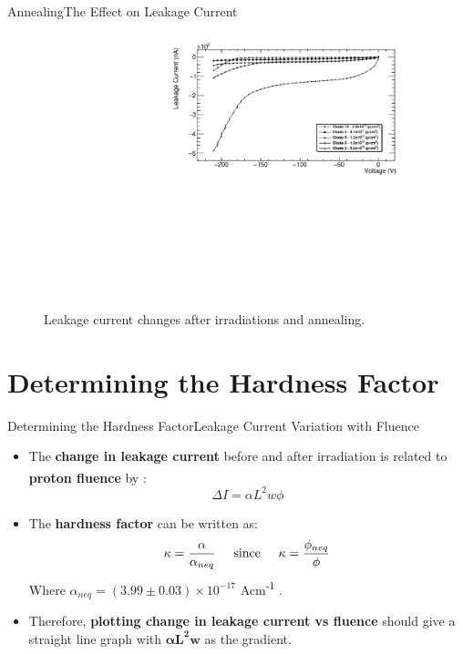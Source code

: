 \documentclass{beamer}
\begin{document}
    \begin{frame}{Annealing}{The Effect on Leakage Current}
        \begin{figure}
            \centering
            \includegraphics[width = 0.95\linewidth]{MultiDiode_Anneal_Fluence_0512.pdf}
            \caption{Leakage current changes after irradiations and annealing.}
        \end{figure}
    \end{frame}
    
\section{Determining the Hardness Factor}
    
    \begin{frame}{Determining the Hardness Factor}{Leakage Current Variation with Fluence}
        \begin{itemize}
            \item The \textbf{change in leakage current} before and after irradiation is related to \textbf{proton fluence} by \textsuperscript{\cite{Moll}}:
                \begin{equation*}
                    \Delta I = \alpha L^2 w \phi
                \end{equation*}
            \item The \textbf{hardness factor} can be written as:
                \begin{equation*}
                    \kappa = \frac{\alpha}{\alpha _{neq}}\hspace{0.5cm}\text{since}\hspace{0.5cm}\kappa = \frac{\phi _{neq}}{\phi}
                \end{equation*}
                Where $\alpha _{neq} = (3.99 \pm 0.03)\times 10^{-17}$ Acm\textsuperscript{-1} \textsuperscript{\cite{Moll}}.
            \item Therefore, \textbf{plotting change in leakage current vs fluence} should give a straight line graph with $\bm{\alpha L^2w}$ as the gradient.
        \end{itemize}
    \end{frame}
\end{document}
